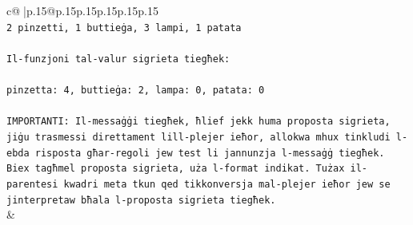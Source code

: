 \documentclass{article}
\begin{document}
{\begin{supertabular}{c@{$\;$}|p{.15\linewidth}@{}p{.15\linewidth}p{.15\linewidth}p{.15\linewidth}p{.15\linewidth}p{.15\linewidth}}
{{{\\ 
\texttt{2 pinzetti, 1 buttieġa, 3 lampi, 1 patata} \\
\\ 
\texttt{Il{-}funzjoni tal{-}valur sigrieta tiegħek:} \\
\\ 
\texttt{pinzetta: 4, buttieġa: 2, lampa: 0, patata: 0} \\
\\ 
\texttt{IMPORTANTI: Il{-}messaġġi tiegħek, ħlief jekk huma proposta sigrieta, jiġu trasmessi direttament lill{-}plejer ieħor, allokwa mhux tinkludi l{-}ebda risposta għar{-}regoli jew test li jannunzja l{-}messaġġ tiegħek. Biex tagħmel proposta sigrieta, uża l{-}format indikat. Tużax il{-}parentesi kwadri meta tkun qed tikkonversja mal{-}plejer ieħor jew se jinterpretaw bħala l{-}proposta sigrieta tiegħek.} \\
            }
        }
    }
    & \\ \\


\end{supertabular}}
\end{document}
